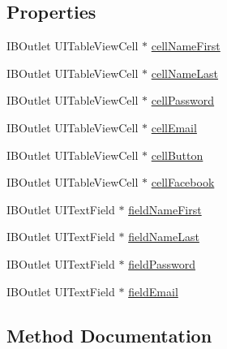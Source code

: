 \subsection*{Properties}
\begin{DoxyCompactItemize}
\item 
I\+B\+Outlet U\+I\+Table\+View\+Cell $\ast$ \hyperlink{interface_e_s_sign_up_view_controller_aa5e9680c08dd216bb4c763a99e6b87f9}{cell\+Name\+First}
\item 
I\+B\+Outlet U\+I\+Table\+View\+Cell $\ast$ \hyperlink{interface_e_s_sign_up_view_controller_a0bfaa1c24d2e8b3b19c707e8a34639b2}{cell\+Name\+Last}
\item 
I\+B\+Outlet U\+I\+Table\+View\+Cell $\ast$ \hyperlink{interface_e_s_sign_up_view_controller_a55e541f4d1da8d33c9baf5bfc5925583}{cell\+Password}
\item 
I\+B\+Outlet U\+I\+Table\+View\+Cell $\ast$ \hyperlink{interface_e_s_sign_up_view_controller_abc2336c2cd392918053ccf420ab22575}{cell\+Email}
\item 
I\+B\+Outlet U\+I\+Table\+View\+Cell $\ast$ \hyperlink{interface_e_s_sign_up_view_controller_ad43eea461b0421116435387f13076d95}{cell\+Button}
\item 
I\+B\+Outlet U\+I\+Table\+View\+Cell $\ast$ \hyperlink{interface_e_s_sign_up_view_controller_ac5c18ba93680443520df0247de8ac481}{cell\+Facebook}
\item 
I\+B\+Outlet U\+I\+Text\+Field $\ast$ \hyperlink{interface_e_s_sign_up_view_controller_a682f54929d184f7f5ad8836976caa4f8}{field\+Name\+First}
\item 
I\+B\+Outlet U\+I\+Text\+Field $\ast$ \hyperlink{interface_e_s_sign_up_view_controller_ab18ed392ce76c100d25681bc39d7375c}{field\+Name\+Last}
\item 
I\+B\+Outlet U\+I\+Text\+Field $\ast$ \hyperlink{interface_e_s_sign_up_view_controller_a4cfa3aa732529c3c51c762238ad7a139}{field\+Password}
\item 
I\+B\+Outlet U\+I\+Text\+Field $\ast$ \hyperlink{interface_e_s_sign_up_view_controller_a37efd61b8578141a576c47832506f0fa}{field\+Email}
\end{DoxyCompactItemize}


\subsection{Method Documentation}
\hypertarget{interface_e_s_sign_up_view_controller_adf3713dc1173e5069875ec5134ca9a5d}{}
